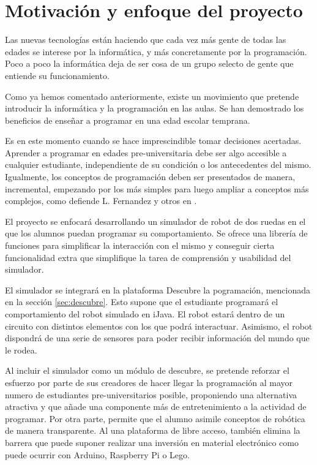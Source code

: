\section{Motivación y enfoque del proyecto}
\label{sec:motivacion}

Las nuevas tecnologías están haciendo que cada vez más gente de todas las edades se interese por la informática, y más concretamente por la programación. Poco a poco la informática deja de ser cosa de un grupo selecto {\color{red}de gente que entiende su funcionamiento}. 

Como ya hemos comentado anteriormente, existe un movimiento que pretende introducir la informática y la programación en las aulas. Se han demostrado los beneficios de enseñar a programar en una edad escolar temprana.

Es en este momento cuando se hace imprescindible tomar decisiones acertadas. Aprender a programar en edades pre-universitaria debe ser algo accesible a cualquier estudiante, independiente de su condición o los antecedentes del mismo. Igualmente, los conceptos de programación deben ser presentados de manera, incremental, empezando por los más simples para luego ampliar a conceptos más complejos, como defiende L. Fernandez y otros en \cite{fernandez2002analisis}.

El proyecto se enfocará desarrollando un simulador de robot de dos ruedas en el que los alumnos puedan programar su comportamiento. Se ofrece una librería de funciones para simplificar la interacción con el mismo y conseguir cierta funcionalidad extra que simplifique la tarea de comprensión y usabilidad del simulador.

El simulador se integrará en la plataforma Descubre la pogramación, mencionada en la sección \ref{sec:descubre}. Esto supone que el estudiante programará el comportamiento del robot simulado en iJava. El robot estará dentro de un circuito con distintos elementos con los que podrá interactuar. Asimismo, el robot dispondrá de una serie de sensores para poder recibir información del mundo que le rodea.

Al incluir el simulador como un módulo de descubre, se pretende reforzar el esfuerzo por parte de sus creadores de hacer llegar la programación al mayor numero de estudiantes pre-universitarios posible, proponiendo una alternativa atractiva y que añade una componente más de entretenimiento a la actividad de programar. {\color{red}Por otra parte, permite que el alumno asimile conceptos de robótica de manera transparente. Al una plataforma de libre acceso, también elimina la barrera que puede suponer realizar una inversión en material electrónico como puede ocurrir con Arduino, Raspberry Pi o Lego.
}

